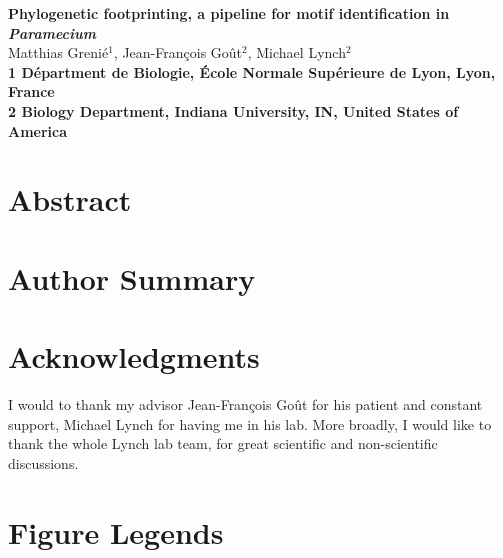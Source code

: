 \documentclass[10pt]{article}
\date{}
\begin{document}
\begin{flushleft}
{\Large
\textbf{Phylogenetic footprinting, a pipeline for motif identification in \textit{Paramecium}}
}
\\
Matthias Grenié$^{1}$, 
Jean-François Goût$^{2}$, 
Michael Lynch$^{2}$
\\
\bf{1} Départment de Biologie, École Normale Supérieure de Lyon, Lyon, France
\\
\bf{2} Biology Department, Indiana University, IN, United States of America
\\
\end{flushleft}

\section*{Abstract}

\section*{Author Summary}









\section*{Acknowledgments}

I would to thank my advisor Jean-François Goût for his patient and constant support, Michael Lynch for having me in his lab. More broadly, I would like to thank the whole Lynch lab team, for great scientific and non-scientific discussions.

\section*{Figure Legends}
\end{document}
